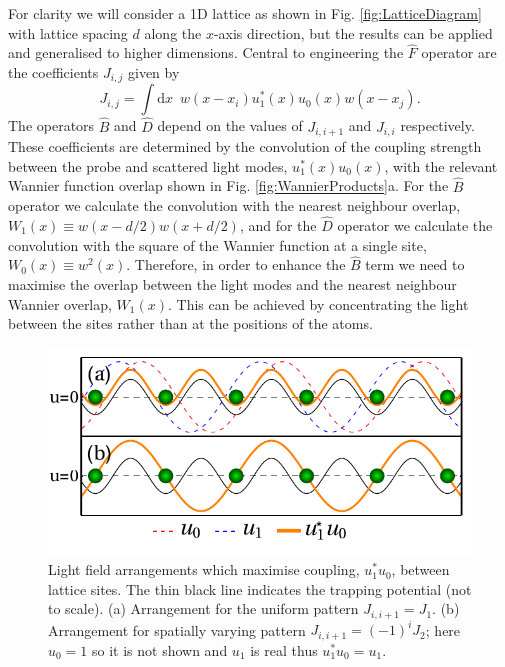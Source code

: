 For clarity we will consider a 1D lattice as shown in
Fig. \ref{fig:LatticeDiagram} with lattice spacing $d$ along the
$x$-axis direction, but the results can be applied and generalised to
higher dimensions. Central to engineering the $\hat{F}$ operator are
the coefficients $J_{i,j}$ given by
\begin{equation}
  \label{eq:Jcoeff}
  J_{i,j} = \int \mathrm{d} x \,\,\, w(x - x_i) u_1^*(x) u_0(x) w(x - x_j).
\end{equation}
The operators $\hat{B}$ and $\hat{D}$ depend on the values of
$J_{i,i+1}$ and $J_{i,i}$ respectively. These coefficients are
determined by the convolution of the coupling strength between the
probe and scattered light modes, $u_1^*(x)u_0(x)$, with the relevant
Wannier function overlap shown in Fig. \ref{fig:WannierProducts}a. For
the $\hat{B}$ operator we calculate the convolution with the nearest
neighbour overlap, $W_1(x) \equiv w(x - d/2) w(x + d/2)$, and for the
$\hat{D}$ operator we calculate the convolution with the square of the
Wannier function at a single site, $W_0(x) \equiv w^2(x)$. Therefore,
in order to enhance the $\hat{B}$ term we need to maximise the overlap
between the light modes and the nearest neighbour Wannier overlap,
$W_1(x)$. This can be achieved by concentrating the light between the
sites rather than at the positions of the atoms. 

\begin{figure}[hbtp!]
  \centering
  \includegraphics[width=0.8\linewidth]{BDiagram}
  \caption[Maximising Light-Matter Coupling between Lattice
  Sites]{Light field arrangements which maximise coupling, $u_1^*u_0$,
    between lattice sites. The thin black line indicates the trapping
    potential (not to scale). (a) Arrangement for the uniform pattern
    $J_{i,i+1} = J_1$. (b) Arrangement for spatially varying pattern
    $J_{i,i+1}=(-1)^i J_2$; here $u_0=1$ so it is not shown and $u_1$
    is real thus $u_1^*u_0=u_1$. \label{fig:BDiagram}}
\end{figure}

